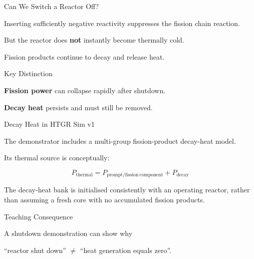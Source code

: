 \documentclass[aspectratio=169]{beamer}
\begin{document}
\begin{frame}{Can We Switch a Reactor Off?}

    Inserting sufficiently negative reactivity suppresses the fission chain
    reaction.

    But the reactor does \textbf{not} instantly become thermally cold.

    \vspace{1em}

    Fission products continue to decay and release heat.

    \vspace{1em}

    \begin{alertblock}{Key Distinction}

        \textbf{Fission power}
        can collapse rapidly after shutdown.

        \vspace{0.5em}

        \textbf{Decay heat}
        persists and must still be removed.

    \end{alertblock}

\end{frame}



\begin{frame}{Decay Heat in HTGR Sim v1}

    The demonstrator includes a multi-group fission-product decay-heat model.

    \vspace{1em}

    Its thermal source is conceptually:

    \[
        P_{\mathrm{thermal}}
        =
        P_{\mathrm{prompt/fission\ component}}
        +
        P_{\mathrm{decay}}
    \]

    \vspace{1em}

    The decay-heat bank is initialised consistently with an operating reactor,
    rather than assuming a fresh core with no accumulated fission products.

    \begin{block}{Teaching Consequence}

        A shutdown demonstration can show why

        \begin{center}
            ``reactor shut down''
            $\neq$
            ``heat generation equals zero''.
        \end{center}

    \end{block}

\end{frame}
\end{document}
